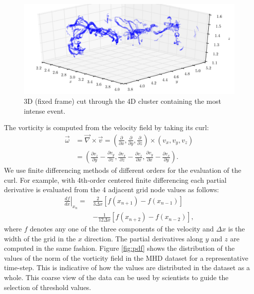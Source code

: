 \documentclass{sig-alternate}
\begin{document}
\begin{figure}[t]
\centering
\includegraphics[width=7in]{Figures/most_intense_cluster_alt.pdf}
\caption{3D (fixed frame) cut through the 4D cluster containing the most intense event.}
\label{fig:max_vort_cluster}
\end{figure}

The vorticity is computed from the velocity field by taking its curl:
\begin{align}
\vec{\omega} &= \vec{\nabla} \times \vec{v} = \left( \frac{\partial}{\partial x}, \frac{\partial}{\partial y}, \frac{\partial}{\partial z} \right) 
\times \nonumber \left( v_x, v_y, v_z \right)\\
&= \left( \frac{\partial v_z}{\partial y} - \frac{\partial v_y}{\partial z}, \frac{\partial v_x}{\partial z} - \frac{\partial v_z}{\partial x}, 
\frac{\partial v_y}{\partial x} - \frac{\partial v_x}{\partial y} \right).
\label{eq:curl}
\end{align}
We use finite differencing methods of
different orders for the evaluation of the curl. For example, with 4th-order centered finite differencing each partial derivative is evaluated from the 4
adjacent grid node values as follows:  
\begin{align} 
\left.\frac{df}{dx}\right|_{x_n} = &\frac{2}{3\Delta x}[f(x_{n+1})-f(x_{n-1})]\nonumber\\ 
&-\frac{1}{12\Delta x}[f(x_{n+2})-f(x_{n-2})],
\end{align}
where $f$ denotes any one of the three components of the velocity and $\Delta x$ is the width of the grid in the $x$ direction. The partial derivatives
along $y$ and $z$ are computed in the same fashion. 
Figure \ref{fig:pdf} shows the distribution of the values of the norm of the vorticity field in the MHD dataset for a representative time-step. This is indicative 
of how the values are distributed in the dataset as a whole.
This coarse view of the data can be used by scientists to guide the selection of threshold values.
\end{document}

